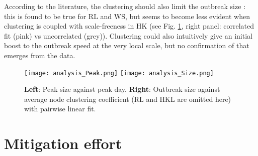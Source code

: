 \documentclass[DIV=12, BCOR=0pt]{scrartcl}  %
\begin{document}
  According to the literature, the clustering should also limit the outbreak size \citep{PastorSatorras}: this is found to be true for RL and WS, but seems to become less evident when clustering is coupled with scale-freeness in HK (see Fig. \ref{fig:analysis}, right panel: correlated fit (pink) vs uncorrelated (grey)). 
  Clustering could also intuitively give an initial boost to the outbreak speed at the very local scale, but no confirmation of that emerges from the data.
  

	\begin{figure}[h]
		\centering
		\texttt{[image: analysis\_Peak.png]}
		\texttt{[image: analysis\_Size.png]}
		\caption{\textbf{Left}: Peak size against peak day. %
			\textbf{Right}: Outbreak size against average node clustering coefficient (RL and HKL are omitted here) with pairwise linear fit.}
		\label{fig:analysis}
	\end{figure}
  

	\section{Mitigation effort}
	\label{sec:miti}
\end{document}
